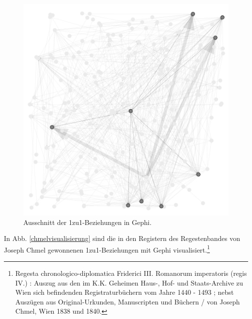 \documentclass[ngerman,]{scrreprt}
\begin{document}
\begin{figure}
\centering
\includegraphics{Bilder/Gephi-Register.png}
\caption{Ausschnitt der 1zu1-Beziehungen in Gephi.}
\label{1zu1gephi}
\end{figure}

In Abb. \ref{chmelvisualisierung} sind die in den Registern des Regestenbandes von Joseph Chmel gewonnenen 1zu1-Beziehungen mit Gephi visualisiert.\footnote{Regesta chronologico-diplomatica Friderici III. Romanorum imperatoris (regis IV.) : Auszug aus den im K.K. Geheimen Haus-, Hof- und Staats-Archive zu Wien sich befindenden Registraturbüchern vom Jahre 1440 - 1493 ; nebst Auszügen aus Original-Urkunden, Manuscripten und Büchern / von Joseph Chmel, Wien 1838 und 1840.}
\end{document}
